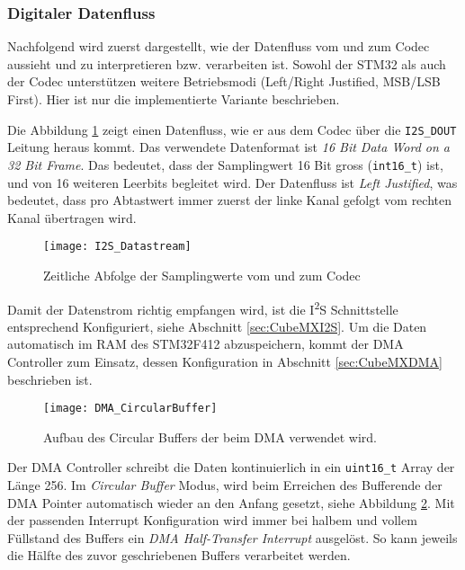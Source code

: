 \subsubsection{Digitaler Datenfluss}
\label{sec:Dataformat}

Nachfolgend wird zuerst dargestellt, wie der Datenfluss vom und zum Codec aussieht und zu interpretieren bzw. verarbeiten ist. 
Sowohl der STM32 als auch der Codec unterstützen weitere Betriebsmodi (Left/Right Justified, MSB/LSB First). Hier ist nur die implementierte Variante beschrieben.

Die Abbildung \ref{pic:I2S_Datastream} zeigt einen Datenfluss, wie er aus dem Codec über die \texttt{I2S\_DOUT} Leitung heraus kommt. 
Das verwendete Datenformat ist \textit{16 Bit Data Word on a 32 Bit Frame}. Das bedeutet, dass der Samplingwert 16 Bit gross (\texttt{int16\_t}) ist, und von 16 weiteren Leerbits begleitet wird.
Der Datenfluss ist \textit{Left Justified}, was bedeutet, dass pro Abtastwert immer zuerst der linke Kanal gefolgt vom rechten Kanal übertragen wird.

\begin{figure}[H]
	\centering
	\texttt{[image: I2S\_Datastream]}
	\caption{Zeitliche Abfolge der Samplingwerte vom und zum Codec}
	\label{pic:I2S_Datastream}
\end{figure}

Damit der Datenstrom richtig empfangen wird, ist die I\textsuperscript{2}S Schnittstelle entsprechend Konfiguriert, siehe Abschnitt \ref{sec:CubeMXI2S}.
Um die Daten automatisch im RAM des STM32F412 abzuspeichern, kommt der DMA Controller zum Einsatz, dessen Konfiguration in Abschnitt \ref{sec:CubeMXDMA} beschrieben ist.

\begin{figure}[H]
	\centering
	\texttt{[image: DMA\_CircularBuffer]}
	\caption{Aufbau des Circular Buffers der beim DMA verwendet wird.}
	\label{pic:DMA_CircularBuffer}
\end{figure}

Der DMA Controller schreibt die Daten kontinuierlich in ein \texttt{uint16\_t} Array der Länge 256. Im \textit{Circular Buffer} Modus, wird beim Erreichen des Bufferende der DMA Pointer automatisch wieder an den Anfang gesetzt, siehe Abbildung \ref{pic:DMA_CircularBuffer}.
Mit der passenden Interrupt Konfiguration wird immer bei halbem und vollem Füllstand des Buffers ein \textit{DMA Half-Transfer Interrupt} ausgelöst.
So kann jeweils die Hälfte des zuvor geschriebenen Buffers verarbeitet werden.




